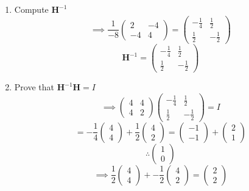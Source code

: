 \documentclass[11pt]{article}
\begin{document}
\begin{enumerate}
\item Compute $\mathbf{H}^{-1}$
\[
\implies \frac{1}{-8}
\begin{pmatrix}
2 & -4\\
-4 & 4
\end{pmatrix} = 
\begin{pmatrix}
-\frac{1}{4}& \frac{1}{2}\\
\frac{1}{2} & -\frac{1}{2}
\end{pmatrix}
\]
\[
\mathbf{H}^{-1} = 
\begin{pmatrix}
-\frac{1}{4}& \frac{1}{2}\\
\frac{1}{2} & -\frac{1}{2}
\end{pmatrix}
\]

\item Prove that $\mathbf{H}^{-1}\mathbf{H} = \mathbf{\mathit{I}}$
\[
\implies
\begin{pmatrix}
4 & 4 \\
4 & 2	
\end{pmatrix}
\begin{pmatrix}
-\frac{1}{4} & \frac{1}{2} \\
\frac{1}{2} &- \frac{1}{2}
\end{pmatrix}
=
\mathbf{\mathit{I}}
\]
\[
=
- \frac{1}{4}
\begin{pmatrix}
4 \\ 4
\end{pmatrix}+ \frac{1}{2}
\begin{pmatrix}
4 \\ 2
\end{pmatrix}
= \begin{pmatrix}
-1 \\ -1
\end{pmatrix}+
\begin{pmatrix}
2 \\1
\end{pmatrix}
\]
\[
\therefore \begin{pmatrix}
1 \\ 0
\end{pmatrix}
\]
\[
\implies
\frac{1}{2}
\begin{pmatrix}
4 \\ 4
\end{pmatrix}
+ - \frac{1}{2}
\begin{pmatrix}
4 \\ 2 
\end{pmatrix} = 
\begin{pmatrix}
2 \\ 2

\end{pmatrix}\]
\end{enumerate}
\end{document}
